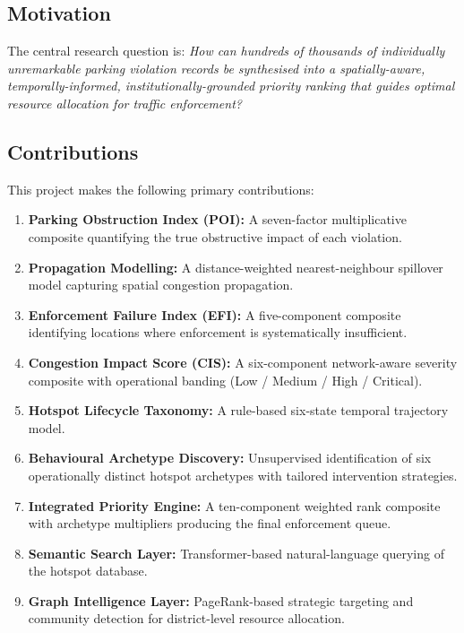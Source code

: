 \documentclass[12pt,a4paper]{article}
\begin{document}
\subsection{Motivation}

The central research question is: \textit{How can hundreds of thousands of individually
unremarkable parking violation records be synthesised into a spatially-aware,
temporally-informed, institutionally-grounded priority ranking that guides optimal resource
allocation for traffic enforcement?}

\subsection{Contributions}

This project makes the following primary contributions:

\begin{enumerate}[leftmargin=1.5em]
  \item \textbf{Parking Obstruction Index (POI):} A seven-factor multiplicative composite
  quantifying the true obstructive impact of each violation.

  \item \textbf{Propagation Modelling:} A distance-weighted nearest-neighbour spillover model
  capturing spatial congestion propagation.

  \item \textbf{Enforcement Failure Index (EFI):} A five-component composite identifying
  locations where enforcement is systematically insufficient.

  \item \textbf{Congestion Impact Score (CIS):} A six-component network-aware severity
  composite with operational banding (Low / Medium / High / Critical).

  \item \textbf{Hotspot Lifecycle Taxonomy:} A rule-based six-state temporal trajectory model.

  \item \textbf{Behavioural Archetype Discovery:} Unsupervised identification of six
  operationally distinct hotspot archetypes with tailored intervention strategies.

  \item \textbf{Integrated Priority Engine:} A ten-component weighted rank composite with
  archetype multipliers producing the final enforcement queue.

  \item \textbf{Semantic Search Layer:} Transformer-based natural-language querying of the
  hotspot database.

  \item \textbf{Graph Intelligence Layer:} PageRank-based strategic targeting and community
  detection for district-level resource allocation.
\end{enumerate}
\end{document}
